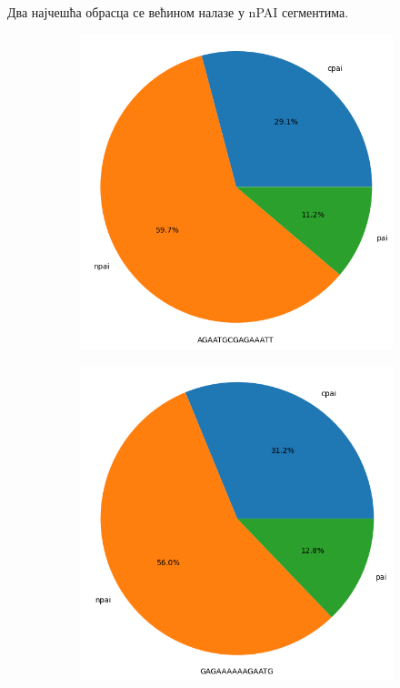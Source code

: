 \documentclass[12pt]{article}
\begin{document}
\newpage

Два најчешћа обрасца се већином налазе у nPAI сегментима.

\begin{figure}[htbp]
    \vspace{0.2cm}
    \centering
    \begin{subfigure}{0.48\linewidth}
        \centering
        \includegraphics[width=\linewidth]{images/first_by_islands_h_pylori.png}
    \end{subfigure}
    \begin{subfigure}{0.48\linewidth}
        \centering
        \includegraphics[width=\linewidth]{images/second_by_islands_h_pylori.png}

\end{subfigure}
\end{figure}
\end{document}
